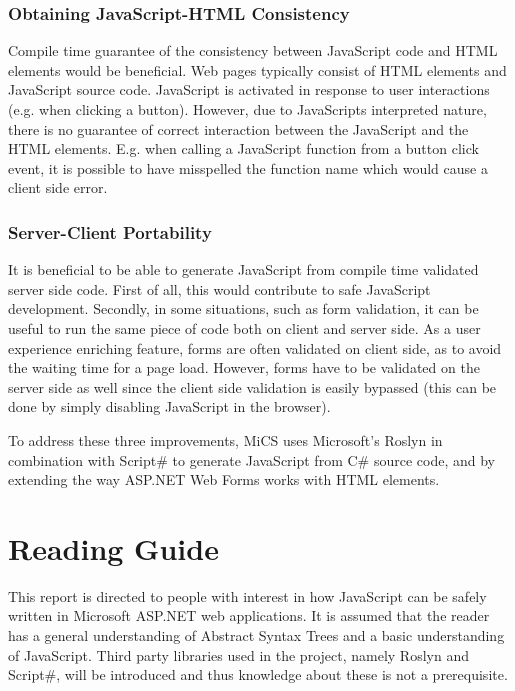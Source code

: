 \subsubsection{Obtaining JavaScript-HTML Consistency} %
\label{ssub:obtaining_javascript_html_consistency}
	Compile time guarantee of the consistency between JavaScript code and HTML elements would be beneficial. Web pages typically consist of HTML elements and JavaScript source code. JavaScript is activated in response to user interactions (e.g. when clicking a button). However, due to JavaScripts interpreted nature, there is no guarantee of correct interaction between the JavaScript and the HTML elements. E.g. when calling a JavaScript function from a button click event, it is possible to have misspelled the function name which would cause a client side error. 

\subsubsection{Server-Client Portability} %
	It is beneficial to be able to generate JavaScript from compile time validated server side code. First of all, this would contribute to safe JavaScript development. Secondly, in some situations, such as form validation, it can be useful to run the same piece of code both on client and server side. As a user experience enriching feature, forms are often validated on client side, as to avoid the waiting time for a page load. However, forms have to be validated on the server side as well since the client side validation is easily bypassed (this can be done by simply disabling JavaScript in the browser). \newline


To address these three improvements, MiCS uses Microsoft's Roslyn in combination with Script\# to generate JavaScript from C\# source code, and by extending the way ASP.NET Web Forms works with HTML elements.

\section{Reading Guide}

	This report is directed to people with interest in how JavaScript can be safely written in Microsoft ASP.NET web applications. It is assumed that the reader has a general understanding of Abstract Syntax Trees and a basic understanding of JavaScript. Third party libraries used in the project, namely Roslyn and Script\#, will be introduced and thus knowledge about these is not a prerequisite.

